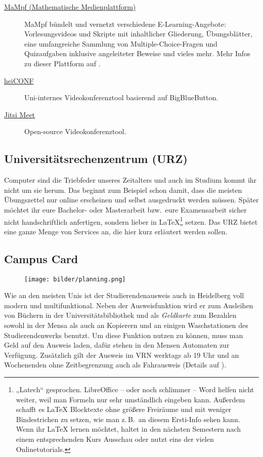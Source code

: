 \begin{description}
	\item[\href{https://mampf.mathi.uni-heidelberg.de}{MaMpf (Mathematische Medienplattform)}]
    MaMpf bündelt und vernetzt verschiedene E-Learning-Angebote: Vorlesungsvideos und Skripte mit inhaltlicher Gliederung, Übungsblätter, eine umfangreiche Sammlung von Multiple-Choice-Fragen und Quizaufgaben inklusive angeleiteter Beweise und vieles mehr. Mehr Infos zu dieser Plattform auf .

	\item[\href{https://heiconf.uni-heidelberg.de}{heiCONF}]
    Uni-internes Videokonferenztool basierend auf BigBlueButton.

	\item[\href{https://meet.jit.si/}{Jitsi Meet}]
    Open-source Videokonferenztool.
\end{description}


\subsection{Universitätsrechenzentrum (URZ)}
\label{urz}
Computer sind die Triebfeder unseres Zeitalters und auch im Studium kommt ihr nicht um sie herum. Das beginnt zum Beispiel schon damit, dass die meisten Übungszettel nur online erscheinen und selbst ausgedruckt werden müssen. Später möchtet ihr eure Bachelor- oder Masterarbeit bzw.\ eure Examensarbeit sicher nicht handschriftlich anfertigen, sondern lieber in \LaTeX \footnote{„Latech“ gesprochen. LibreOffice -- oder noch schlimmer -- Word helfen nicht weiter, weil man Formeln nur sehr umständlich eingeben kann. Außerdem schafft es \LaTeX{} Blocktexte ohne größere Freiräume und mit weniger Bindestrichen zu setzen, wie man z.\,B.\ an diesem Ersti-Info sehen kann. Wenn ihr \LaTeX{} lernen möchtet, haltet in den nächsten Semestern nach einem entsprechenden Kurs Ausschau oder nutzt eins der vielen Onlinetutorials.} setzen. Das \gls{URZ} bietet eine ganze Menge von Services an, die hier kurz erläutert werden sollen.

\subsection{Campus Card}
\label{campuscard}

\begin{figure}[b]
    \centering
    \texttt{[image: bilder/planning.png]}
\end{figure}

Wie an den meisten Unis ist der Studierendenausweis auch in Heidelberg voll modern und multifunktional. Neben der Ausweisfunktion wird er zum Ausleihen von Büchern in der Universitätsbibliothek und als \emph{Geldkarte} zum Bezahlen sowohl in der Mensa als auch an Kopierern und an einigen Waschstationen des Studierendenwerks benutzt. Um diese Funktion nutzen zu können, muss man Geld auf den Ausweis laden, dafür stehen in den Mensen Automaten zur Verfügung. Zusätzlich gilt der Ausweis im \gls{VRN} werktags ab 19 Uhr und an Wochenenden ohne Zeitbegrenzung auch als Fahrausweis (Details auf ).

